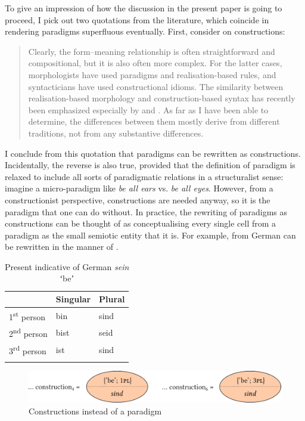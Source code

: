 \documentclass[output=paper]{langsci/langscibook}
\begin{document}
To give an impression of how the discussion in the present paper is going to proceed, I pick out two quotations from the literature, which coincide in rendering paradigms superfluous eventually. First, consider \citet{Haspelmath2011} on constructions:

\begin{quote}
Clearly, the form–meaning relationship is often straightforward and compositional, but it is also often more complex. For the latter cases, morphologists have used paradigms and realisation-based rules, and syntacticians have used constructional idioms. The similarity between realisation-based morphology and construction-based syntax has recently been emphasized especially by \citet{Gurevich2006} and \citet{Booij2010}. As far as I have been able to determine, the differences between them mostly derive from different traditions, not from any substantive differences. \citep[59]{Haspelmath2011}
\end{quote}

I conclude from this quotation that paradigms can be rewritten as constructions. Incidentally, the reverse is also true, provided that the definition of paradigm is relaxed to include all sorts of paradigmatic relations in a structuralist sense: imagine a micro-paradigm like \textit{be all ears} vs. \textit{be all eyes}. However, from a constructionist perspective, constructions are needed anyway, so it is the paradigm that one can do without. In practice, the rewriting of paradigms as constructions can be thought of as conceptualising every single cell from a paradigm as the small semiotic entity that it is. For example,  from German can be rewritten in the manner of .

\begin{table}
\caption{Present indicative of German \textit{sein} ʻbeʼ\label{tab:reiner:1}}
\begin{tabular}{lll}
\lsptoprule
 & Singular & Plural\\\midrule
1\textsuperscript{st} person & bin & sind\\
2\textsuperscript{nd} person & bist & seid\\
3\textsuperscript{rd} person & ist & sind\\
\lspbottomrule
\end{tabular}
\end{table}

  
\begin{figure}
  \includegraphics[width=\textwidth]{figures/Reiner1.pdf}
  \caption{Constructions instead of a paradigm\label{fig:reiner:1}}
\end{figure}
\end{document}
